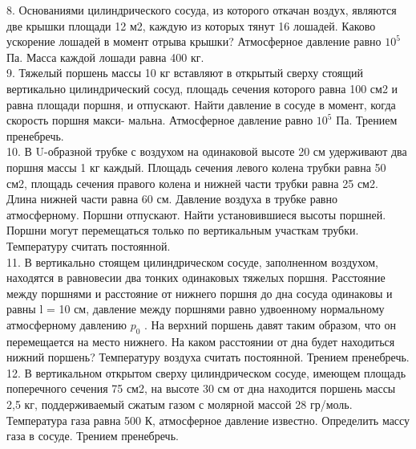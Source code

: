 \documentclass[A4paper]{article}
\begin{document}
    8. Основаниями цилиндрического сосуда, из которого откачан воздух, являются две крышки площади 12 м2, каждую из которых тянут 16 лошадей. Каково ускорение лошадей в момент отрыва крышки?  Атмосферное давление равно $10^5$ Па. Масса каждой лошади равна 400 кг.\\
    
    9. Тяжелый поршень массы 10 кг вставляют в открытый сверху стоящий вертикально цилиндрический сосуд, площадь сечения которого равна 100 см2 и равна площади поршня, и отпускают. Найти давление в сосуде в момент, когда скорость поршня макси-
    мальна. Атмосферное давление равно $10^5$ Па. Трением пренебречь.\\
    
    10. В U-образной трубке с воздухом на одинаковой высоте 20 см удерживают два поршня массы 1 кг каждый. Площадь сечения левого колена трубки равна 50 см2, площадь сечения правого колена и нижней части трубки равна 25 см2. Длина нижней части равна 60 см. Давление воздуха в трубке равно атмосферному. Поршни отпускают. Найти установившиеся высоты поршней. Поршни могут перемещаться только по вертикальным участкам трубки. Температуру считать постоянной.\\
    
    11. В вертикально стоящем цилиндрическом сосуде, заполненном воздухом, находятся в равновесии два тонких одинаковых тяжелых поршня. Расстояние между поршнями и расстояние от нижнего поршня до дна сосуда одинаковы и равны l = 10 см, давление между поршнями равно удвоенному нормальному атмосферному давлению $ p_0 $ . На верхний поршень давят таким образом, что он перемещается на место нижнего. На каком расстоянии от дна будет находиться нижний поршень? Температуру воздуха считать постоянной. Трением пренебречь.\\
    
    12. В вертикальном открытом сверху цилиндрическом сосуде, имеющем площадь поперечного сечения 75 см2, на высоте 30 см от дна находится поршень массы 2,5 кг, поддерживаемый сжатым газом с молярной массой 28 гр/моль. Температура газа равна 500 К, атмосферное давление известно. Определить массу газа в сосуде. Трением пренебречь.\\
    
    
    
    
\end{document}
